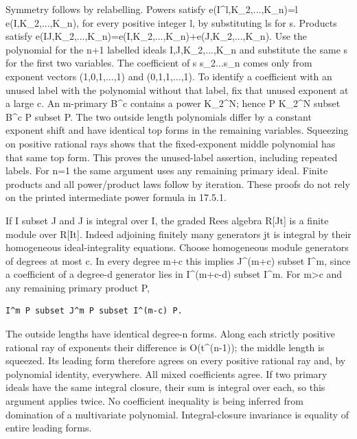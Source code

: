 \documentclass[11pt]{article}
\begin{document}
Symmetry follows by relabelling. Powers satisfy e(I\textasciicircum{}l,K\_2,...,K\_n)=l e(I,K\_2,...,K\_n), for every positive integer l, by substituting ls for s. Products satisfy e(IJ,K\_2,...,K\_n)=e(I,K\_2,...,K\_n)+e(J,K\_2,...,K\_n). Use the polynomial for the n+1 labelled ideals I,J,K\_2,...,K\_n and substitute the same s for the first two variables. The coefficient of s s\_2...s\_n comes only from exponent vectors (1,0,1,...,1) and (0,1,1,...,1). To identify a coefficient with an unused label with the polynomial without that label, fix that unused exponent at a large c. An m-primary B\textasciicircum{}c contains a power K\_2\textasciicircum{}N; hence P K\_2\textasciicircum{}N subset B\textasciicircum{}c P subset P. The two outside length polynomials differ by a constant exponent shift and have identical top forms in the remaining variables. Squeezing on positive rational rays shows that the fixed-exponent middle polynomial has that same top form. This proves the unused-label assertion, including repeated labels. For n=1 the same argument uses any remaining primary ideal. Finite products and all power/product laws follow by iteration. These proofs do not rely on the printed intermediate power formula in 17.5.1.

If I subset J and J is integral over I, the graded Rees algebra R[Jt] is a finite module over R[It]. Indeed adjoining finitely many generators jt is integral by their homogeneous ideal-integrality equations. Choose homogeneous module generators of degrees at most c. In every degree m+c this implies J\textasciicircum{}(m+c) subset I\textasciicircum{}m, since a coefficient of a degree-d generator lies in I\textasciicircum{}(m+c-d) subset I\textasciicircum{}m. For m>c and any remaining primary product P,

\begin{Verbatim}[fontsize=\small,breaklines=true,breakanywhere=true]
I^m P subset J^m P subset I^(m-c) P.
\end{Verbatim}

The outside lengths have identical degree-n forms. Along each strictly positive rational ray of exponents their difference is O(t\textasciicircum{}(n-1)); the middle length is squeezed. Its leading form therefore agrees on every positive rational ray and, by polynomial identity, everywhere. All mixed coefficients agree. If two primary ideals have the same integral closure, their sum is integral over each, so this argument applies twice. No coefficient inequality is being inferred from domination of a multivariate polynomial. Integral-closure invariance is equality of entire leading forms.
\end{document}
